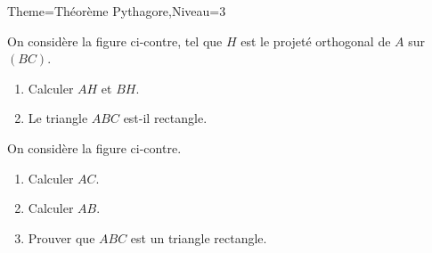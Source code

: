 \documentclass[a4paper,12pt]{article}
\begin{document}
\begin{Maquette}[Fiche]{Theme=Théorème Pythagore,Niveau=3}

\begin{exercice}
\begin{minipage}{.6\linewidth}
On considère la figure ci-contre, tel que $H$ est le projeté orthogonal de $A$ sur $(BC)$.
\begin{enumerate}
\item Calculer $AH$ et $BH$.
\item Le triangle $ABC$ est-il rectangle.
\end{enumerate}

\end{minipage}%
\begin{minipage}{.4\linewidth}
\end{minipage}
\end{exercice}

\begin{exercice}
\begin{minipage}{.5\linewidth}
\end{minipage}%
\begin{minipage}{.5\linewidth}
On considère la figure ci-contre.
\begin{enumerate}
\item Calculer $AC$.
\item Calculer $AB$.
\item Prouver que $ABC$ est un triangle rectangle.
\end{enumerate}
\end{minipage}
\end{exercice}


\end{Maquette}
\end{document}
